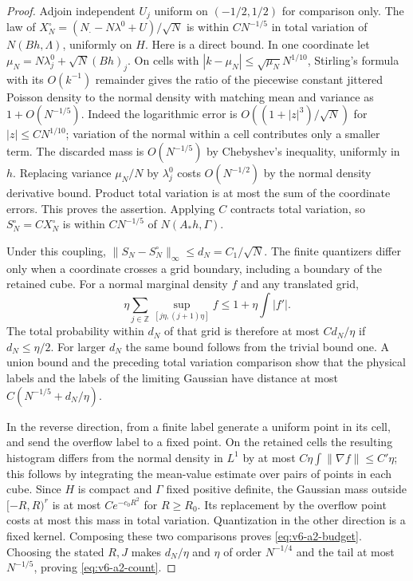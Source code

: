 \begin{proof}
Adjoin independent $U_j$ uniform on $(-1/2,1/2)$ for comparison only.
The law of
$X_N^\circ=(N_\cdot-N\lambda^0+U)/\sqrt N$ is within $C N^{-1/5}$
in total variation of $N(Bh,\Lambda)$, uniformly on $H$.
Here is a direct bound. In one coordinate let
$\mu_N=N\lambda_j^0+\sqrt N(Bh)_j$. On cells with
$|k-\mu_N|\le\sqrt{\mu_N}N^{1/10}$, Stirling's formula with its
$O(k^{-1})$ remainder gives the ratio of the piecewise constant
jittered Poisson density to the normal density with matching mean
and variance as $1+O(N^{-1/5})$. Indeed the logarithmic error is
$O((1+|z|^3)/\sqrt N)$ for $|z|\le C N^{1/10}$; variation of the
normal within a cell contributes only a smaller term. The discarded
mass is $O(N^{-1/5})$ by Chebyshev's inequality, uniformly in $h$.
Replacing variance $\mu_N/N$ by $\lambda_j^0$ costs $O(N^{-1/2})$
by the normal density derivative bound. Product total variation is
at most the sum of the coordinate errors. This proves the assertion.
Applying $C$ contracts total variation, so
$S_N^\circ=CX_N^\circ$ is within $CN^{-1/5}$ of $N(A_*h,\Gamma)$.

Under this coupling, $\|S_N-S_N^\circ\|_\infty\le d_N=C_1/\sqrt N$.
The finite quantizers differ only when a coordinate crosses a grid
boundary, including a boundary of the retained cube. For a normal
marginal density $f$ and any translated grid,
\[
 \eta\sum_{j\in\mathbb Z}\sup_{[j\eta,(j+1)\eta]}f
      \le1+\eta\int|f'|.
\]
The total probability within $d_N$ of that grid is therefore at most
$Cd_N/\eta$ if $d_N\le\eta/2$. For larger $d_N$ the same bound
follows from the trivial bound one. A union bound and the preceding
total variation comparison show that the physical labels and the
labels of the limiting Gaussian have distance at most
$C(N^{-1/5}+d_N/\eta)$.

In the reverse direction, from a finite label generate a uniform
point in its cell, and send the overflow label to a fixed point.
On the retained cells the resulting histogram differs from the
normal density in $L^1$ by at most
$C\eta\int\|\nabla f\|\le C'\eta$; this follows by integrating the
mean-value estimate over pairs of points in each cube. Since $H$ is
compact and $\Gamma$ fixed positive definite, the Gaussian mass
outside $[-R,R)^r$ is at most $C e^{-c_0R^2}$ for $R\ge R_0$.
Its replacement by the overflow point costs at most this mass in
total variation. Quantization in the other direction is a fixed
kernel. Composing these two comparisons proves
\eqref{eq:v6-a2-budget}. Choosing the stated $R,J$ makes
$d_N/\eta$ and $\eta$ of order $N^{-1/4}$ and the tail at most
$N^{-1/5}$, proving \eqref{eq:v6-a2-count}.
\end{proof}

